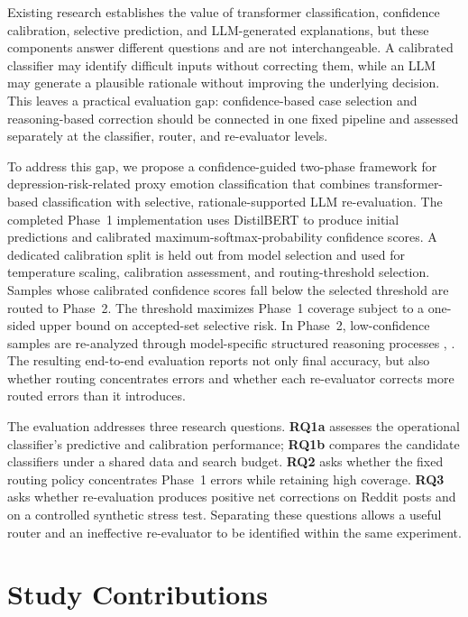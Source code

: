 \documentclass{ieeeaccess}
\begin{document}
Existing research establishes the value of transformer classification, confidence calibration, selective prediction, and LLM-generated explanations, but these components answer different questions and are not interchangeable. A calibrated classifier may identify difficult inputs without correcting them, while an LLM may generate a plausible rationale without improving the underlying decision. This leaves a practical evaluation gap: confidence-based case selection and reasoning-based correction should be connected in one fixed pipeline and assessed separately at the classifier, router, and re-evaluator levels.

To address this gap, we propose a confidence-guided two-phase framework for depression-risk-related proxy emotion classification that combines transformer-based classification with selective, rationale-supported LLM re-evaluation. The completed Phase~1 implementation uses DistilBERT to produce initial predictions and calibrated maximum-softmax-probability confidence scores. A dedicated calibration split is held out from model selection and used for temperature scaling, calibration assessment, and routing-threshold selection. Samples whose calibrated confidence scores fall below the selected threshold are routed to Phase~2. The threshold maximizes Phase~1 coverage subject to a one-sided upper bound on accepted-set selective risk. In Phase~2, low-confidence samples are re-analyzed through model-specific structured reasoning processes \cite{ref17}, \cite{ref18}. The resulting end-to-end evaluation reports not only final accuracy, but also whether routing concentrates errors and whether each re-evaluator corrects more routed errors than it introduces.

The evaluation addresses three research questions. \textbf{RQ1a} assesses the operational classifier's predictive and calibration performance; \textbf{RQ1b} compares the candidate classifiers under a shared data and search budget. \textbf{RQ2} asks whether the fixed routing policy concentrates Phase~1 errors while retaining high coverage. \textbf{RQ3} asks whether re-evaluation produces positive net corrections on Reddit posts and on a controlled synthetic stress test. Separating these questions allows a useful router and an ineffective re-evaluator to be identified within the same experiment.

\section{Study Contributions}
\end{document}
